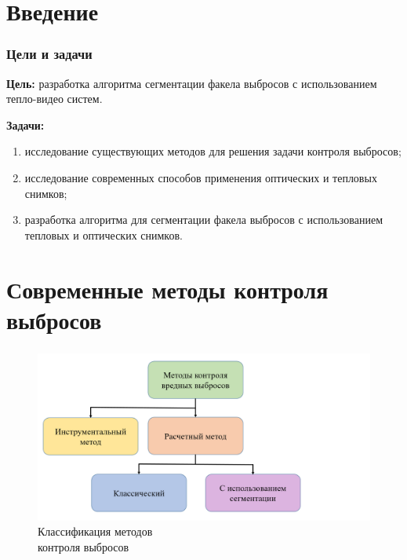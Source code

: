 \documentclass[t]{beamer}
\begin{document}
	
	\firstpage
	\justifying
\section{Введение}

	\begin{frame}
		\frametitle{Цели и задачи} 
		\textbf{Цель:} разработка алгоритма сегментации факела выбросов с использованием тепло-видео систем.
		
		\textbf{Задачи:}
		\begin{enumerate}
			\justifying
			\item исследование существующих методов для решения задачи контроля выбросов;
			\item исследование современных способов применения оптических и тепловых снимков;
			\item разработка алгоритма для сегментации факела выбросов с использованием тепловых и оптических снимков.
		\end{enumerate}
	\end{frame}

\section[Современные методы]{Современные методы контроля выбросов}
	\begin{frame}
		\frametitle{\insertsection} 
		\begin{figure}
			\centering
			\includegraphics[width = \textwidth]{image/scheme1_upd}	
			\caption{Классификация методов\\ контроля выбросов}
			\label{fig:scheme1}
		\end{figure}
	\end{frame}
\end{document}
